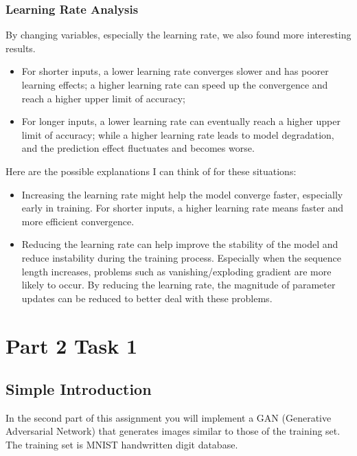 \documentclass{article}
\begin{document}
\subsubsection{Learning Rate Analysis}

By changing variables, especially the learning rate, we also found more interesting results.
\begin{itemize}
    \item For shorter inputs, a lower learning rate converges slower and has poorer learning effects; a higher learning rate can speed up the convergence and reach a higher upper limit of accuracy;
    \item For longer inputs, a lower learning rate can eventually reach a higher upper limit of accuracy; while a higher learning rate leads to model degradation, and the prediction effect fluctuates and becomes worse.
\end{itemize}

Here are the possible explanations I can think of for these situations:

\begin{itemize}
    \item Increasing the learning rate might help the model converge faster, especially early in training. For shorter inputs, a higher learning rate means faster and more efficient convergence.
    \item Reducing the learning rate can help improve the stability of the model and reduce instability during the training process. Especially when the sequence length increases, problems such as vanishing/exploding gradient are more likely to occur. By reducing the learning rate, the magnitude of parameter updates can be reduced to better deal with these problems.
\end{itemize}


\section{Part 2 Task 1}

\subsection{Simple Introduction}

In the second part of this assignment you will implement a GAN (Generative Adversarial Network) \cite{goodfellow2014generative} that generates images similar to those of the training set. The training set is MNIST handwritten digit database.
\end{document}
